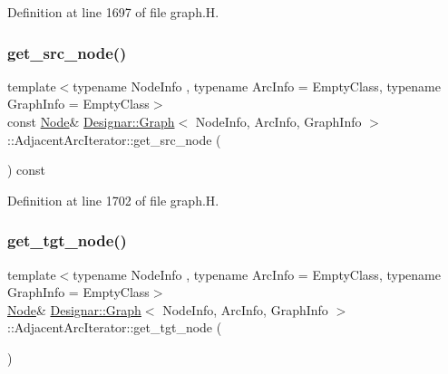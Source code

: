 Definition at line 1697 of file graph.\+H.

\mbox{\label{class_designar_1_1_graph_1_1_adjacent_arc_iterator_ae4ba07319b439cc08df6c957a61bc224}} 
\subsubsection{\texorpdfstring{get\+\_\+src\+\_\+node()}{get\_src\_node()}\hspace{0.1cm}{\footnotesize\ttfamily [2/2]}}
{\footnotesize\ttfamily template$<$typename Node\+Info , typename Arc\+Info  = Empty\+Class, typename Graph\+Info  = Empty\+Class$>$ \\
const \hyperlink{class_designar_1_1_graph_a5dfc7dba9d092ac489c72e40390c37d0}{Node}\& \hyperlink{class_designar_1_1_graph}{Designar\+::\+Graph}$<$ Node\+Info, Arc\+Info, Graph\+Info $>$\+::Adjacent\+Arc\+Iterator\+::get\+\_\+src\+\_\+node (\begin{DoxyParamCaption}{ }\end{DoxyParamCaption}) const\hspace{0.3cm}{\ttfamily [inline]}}



Definition at line 1702 of file graph.\+H.

\mbox{\label{class_designar_1_1_graph_1_1_adjacent_arc_iterator_a400e7399fa39eb49e64afcd2d0b26ff6}} 
\subsubsection{\texorpdfstring{get\+\_\+tgt\+\_\+node()}{get\_tgt\_node()}\hspace{0.1cm}{\footnotesize\ttfamily [1/2]}}
{\footnotesize\ttfamily template$<$typename Node\+Info , typename Arc\+Info  = Empty\+Class, typename Graph\+Info  = Empty\+Class$>$ \\
\hyperlink{class_designar_1_1_graph_a5dfc7dba9d092ac489c72e40390c37d0}{Node}\& \hyperlink{class_designar_1_1_graph}{Designar\+::\+Graph}$<$ Node\+Info, Arc\+Info, Graph\+Info $>$\+::Adjacent\+Arc\+Iterator\+::get\+\_\+tgt\+\_\+node (\begin{DoxyParamCaption}{ }\end{DoxyParamCaption})\hspace{0.3cm}{\ttfamily [inline]}}



